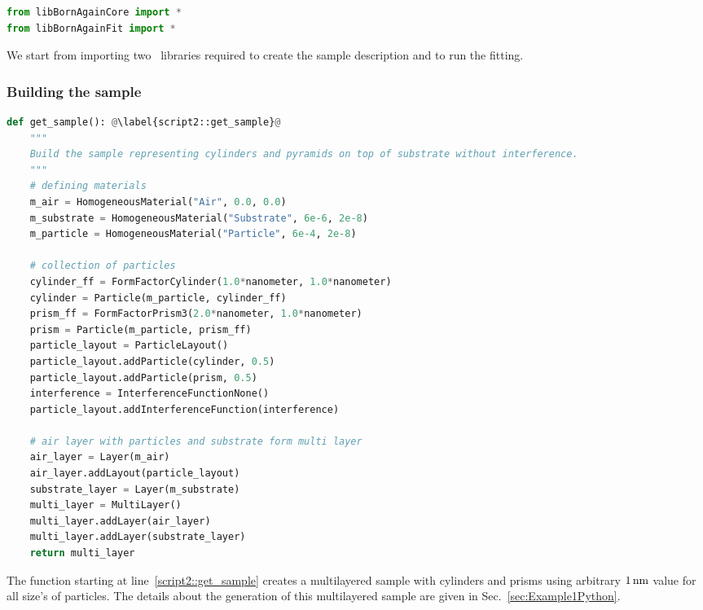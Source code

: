 \begin{lstlisting}[language=python, style=eclipseboxed]
from libBornAgainCore import *
from libBornAgainFit import *
\end{lstlisting}
We start from importing two \BornAgain\ libraries required to create
the sample description
and to run the fitting.

\subsubsection*{Building the sample}

\begin{lstlisting}[language=python, style=eclipseboxed, firstnumber=5]
def get_sample(): @\label{script2::get_sample}@
    """
    Build the sample representing cylinders and pyramids on top of substrate without interference.
    """
    # defining materials
    m_air = HomogeneousMaterial("Air", 0.0, 0.0)
    m_substrate = HomogeneousMaterial("Substrate", 6e-6, 2e-8)
    m_particle = HomogeneousMaterial("Particle", 6e-4, 2e-8)

    # collection of particles
    cylinder_ff = FormFactorCylinder(1.0*nanometer, 1.0*nanometer)
    cylinder = Particle(m_particle, cylinder_ff)
    prism_ff = FormFactorPrism3(2.0*nanometer, 1.0*nanometer)
    prism = Particle(m_particle, prism_ff)
    particle_layout = ParticleLayout()
    particle_layout.addParticle(cylinder, 0.5)
    particle_layout.addParticle(prism, 0.5)
    interference = InterferenceFunctionNone()
    particle_layout.addInterferenceFunction(interference)

    # air layer with particles and substrate form multi layer
    air_layer = Layer(m_air)
    air_layer.addLayout(particle_layout)
    substrate_layer = Layer(m_substrate)
    multi_layer = MultiLayer()
    multi_layer.addLayer(air_layer)
    multi_layer.addLayer(substrate_layer)
    return multi_layer
\end{lstlisting}
The function starting at line~\ref{script2::get_sample} creates a multilayered sample
with cylinders and prisms using arbitrary $1\,{\rm nm}$ value for all size's of particles.
The details about the generation of this multilayered sample are given in Sec.~\ref{sec:Example1Python}.

